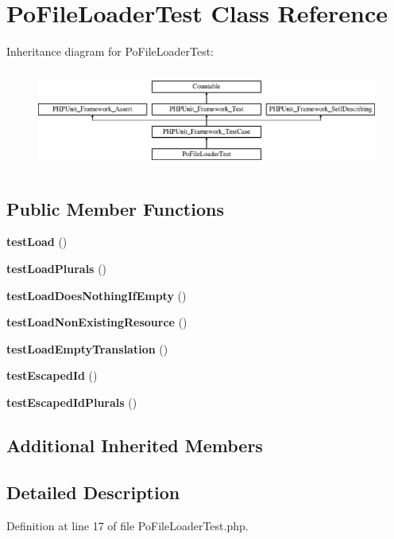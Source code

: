 \section{Po\+File\+Loader\+Test Class Reference}
\label{class_symfony_1_1_component_1_1_translation_1_1_tests_1_1_loader_1_1_po_file_loader_test}
Inheritance diagram for Po\+File\+Loader\+Test\+:\begin{figure}[H]
\begin{center}
\leavevmode
\includegraphics[height=3.303835cm]{class_symfony_1_1_component_1_1_translation_1_1_tests_1_1_loader_1_1_po_file_loader_test}
\end{center}
\end{figure}
\subsection*{Public Member Functions}
\begin{DoxyCompactItemize}
\item 
{\bf test\+Load} ()
\item 
{\bf test\+Load\+Plurals} ()
\item 
{\bf test\+Load\+Does\+Nothing\+If\+Empty} ()
\item 
{\bf test\+Load\+Non\+Existing\+Resource} ()
\item 
{\bf test\+Load\+Empty\+Translation} ()
\item 
{\bf test\+Escaped\+Id} ()
\item 
{\bf test\+Escaped\+Id\+Plurals} ()
\end{DoxyCompactItemize}
\subsection*{Additional Inherited Members}


\subsection{Detailed Description}


Definition at line 17 of file Po\+File\+Loader\+Test.\+php.



